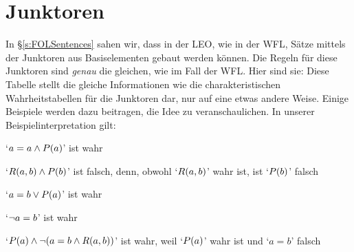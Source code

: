 \section{Junktoren}
In \S\ref{s:FOLSentences} sahen wir, dass in der LEO, wie in der WFL, Sätze mittels der Junktoren aus Basiselementen gebaut werden können. Die Regeln für diese Junktoren sind \emph{genau} die gleichen, wie im Fall der WFL. Hier sind sie:
Diese Tabelle stellt die gleiche Informationen wie die charakteristischen Wahrheitstabellen für die Junktoren dar, nur auf eine etwas andere Weise. Einige Beispiele werden dazu beitragen, die Idee zu veranschaulichen. In unserer Beispielinterpretation gilt:
	\begin{earg}
		\item[\textbullet] `$a = a \wedge \mathord{P}(a)$' ist wahr
		\item[\textbullet] `$\mathord{R}(a,b) \wedge \mathord{P}(b)$' ist falsch, denn, obwohl `$\mathord{R}(a,b)$' wahr ist, ist `$\mathord{P}(b)$' falsch
		\item[\textbullet] `$a = b \vee \mathord{P}(a)$' ist wahr
		\item[\textbullet] `$\neg a = b$' ist wahr
		\item[\textbullet] `$\mathord{P}(a) \wedge \neg( a= b \wedge \mathord{R}(a,b))$' ist wahr, weil `$\mathord{P}(a)$' wahr ist und `$a = b$' falsch
	\end{earg}

